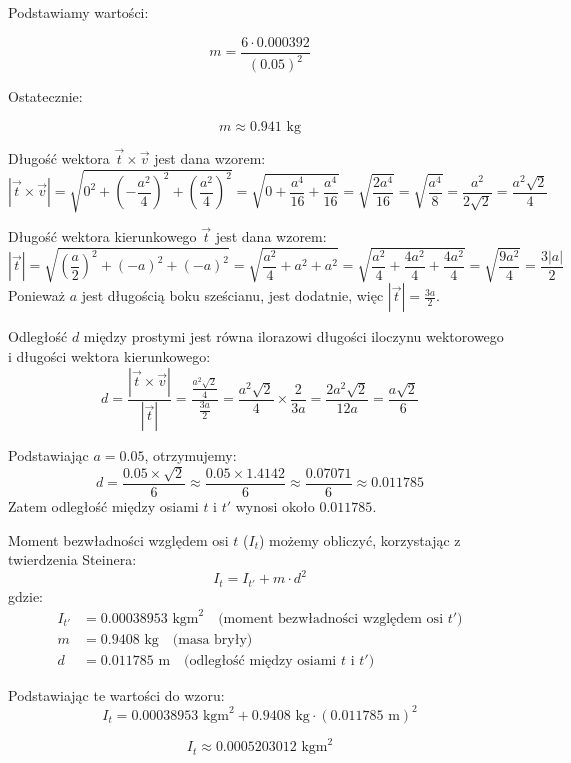 \documentclass[a4paper,12pt]{article}
\begin{document}
Podstawiamy wartości:

\[
    m = \frac{6 \cdot 0.000392}{(0.05)^2}
\]


Ostatecznie:

\[
    m \approx 0.941 \text{ kg}
\]


Długość wektora $\vec{t} \times \vec{v}$ jest dana wzorem:
\[
    |\vec{t} \times \vec{v}| = \sqrt{0^2 + \left(-\frac{a^2}{4}\right)^2 + \left(\frac{a^2}{4}\right)^2} = \sqrt{0 + \frac{a^4}{16} + \frac{a^4}{16}} = \sqrt{\frac{2a^4}{16}} = \sqrt{\frac{a^4}{8}} = \frac{a^2}{2\sqrt{2}} = \frac{a^2\sqrt{2}}{4}
\]


Długość wektora kierunkowego $\vec{t}$ jest dana wzorem:
\[
    |\vec{t}| = \sqrt{\left(\frac{a}{2}\right)^2 + (-a)^2 + (-a)^2} = \sqrt{\frac{a^2}{4} + a^2 + a^2} = \sqrt{\frac{a^2}{4} + \frac{4a^2}{4} + \frac{4a^2}{4}} = \sqrt{\frac{9a^2}{4}} = \frac{3|a|}{2}
\]
Ponieważ $a$ jest długością boku sześcianu, jest dodatnie, więc $|\vec{t}| = \frac{3a}{2}$.


Odległość $d$ między prostymi jest równa ilorazowi długości iloczynu wektorowego i długości wektora kierunkowego:
\[
    d = \frac{|\vec{t} \times \vec{v}|}{|\vec{t}|} = \frac{\frac{a^2\sqrt{2}}{4}}{\frac{3a}{2}} = \frac{a^2\sqrt{2}}{4} \times \frac{2}{3a} = \frac{2a^2\sqrt{2}}{12a} = \frac{a\sqrt{2}}{6}
\]

Podstawiając $a = 0.05$, otrzymujemy:
\[
    d = \frac{0.05 \times \sqrt{2}}{6} \approx \frac{0.05 \times 1.4142}{6} \approx \frac{0.07071}{6} \approx 0.011785
\]
Zatem odległość między osiami $t$ i $t'$ wynosi około $0.011785$.\par


Moment bezwładności względem osi $t$ ($I_t$) możemy obliczyć, korzystając z twierdzenia Steinera:
\[
    I_t = I_{t'} + m \cdot d^2
\]
gdzie:
\begin{align*}
    I_{t'} & = 0.00038953 \text{ kgm}^2 \quad \text{(moment bezwładności względem osi } t') \\
    m      & = 0.9408 \text{ kg} \quad \text{(masa bryły)}                                  \\
    d      & = 0.011785 \text{ m} \quad \text{(odległość między osiami } t \text{ i } t')
\end{align*}

Podstawiając te wartości do wzoru:
\[
    I_t = 0.00038953 \text{ kgm}^2 + 0.9408 \text{ kg} \cdot (0.011785 \text{ m})^2
\]

\[
    I_t \approx 0.0005203012 \text{ kgm}^2
\]
\end{document}
